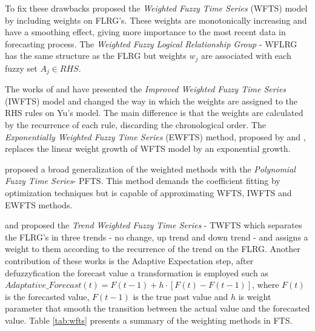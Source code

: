 
To fix these drawbacks \cite{yu2005weighted} proposed the \textit{Weighted Fuzzy Time Series} (WFTS) model by including weights on FLRG's. These weights are monotonically increasing and have a smoothing effect, giving more importance to the most recent data in forecasting process. The \textit{Weighted Fuzzy Logical Relationship Group} - WFLRG has the same structure as the FLRG but weights $w_j$ are associated with each fuzzy set $A_j \in RHS$. 


The works of \cite{ismail2011enrollment} and \cite{efendi2013improved} have presented the \textit{Improved Weighted Fuzzy Time Series} (IWFTS) model and changed the way in which the weights are assigned to the RHS rules on Yu's model. The main difference is that the weights are calculated by the recurrence of each rule, discarding the chronological order. The \textit{Exponentially Weighted Fuzzy Time Series} (EWFTS) method, proposed by \cite{sadaei2014short} and \cite{Talarposhti2016a}, replaces the linear weight growth of WFTS model by an exponential growth. 


\cite{lee2013introducing} proposed a broad generalization of the weighted methods with the \textit{Polynomial Fuzzy Time Series}- PFTS. This method demands the coefficient fitting by optimization techniques but is capable of approximating WFTS, IWFTS and EWFTS methods.


\cite{Cheng2008} and \cite{cheng2009forecasting} proposed the \textit{Trend Weighted Fuzzy Time Series} - TWFTS which separates the FLRG's in three trends - no change, up trend and down trend - and assigns a weight to them according to the recurrence of the trend on the FLRG. Another contribution of these works is the Adaptive Expectation step, after defuzzyfication the forecast value a transformation is employed  such as $Adaptative\_Forecast(t) = F(t-1) + h\cdot[F(t) - F(t-1)]$, where $F(t)$ is the forecasted value, $F(t-1)$ is the true past value and $h$ is weight parameter that smooth the transition between the actual value and the forecasted value. Table \ref{tab:wfts} presents a summary of the weighting methods in FTS.

